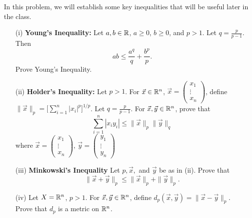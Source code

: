 \documentclass[a4paper]{article}
\begin{document}
\begin{problem}
    In this problem, we will establish some key inequalities that will be useful later in the class. 
    \begin{enumerate}
        \item[(i)] \textbf{Young's Inequality:} Let \( a,b \in \mathbb{R}  \), \( a \geq 0  \), \( b \geq 0  \), and \( p > 1  \). Let \( q = \frac{  p  }{  p - 1  }  \). Then
            \[ ab \leq \frac{ a^{q} }{ q  }  + \frac{ b^{p} }{ p }. \]
           Prove Young's Inequality. 
       \item[(ii)] \textbf{Holder's Inequality:} Let \( p > 1  \). For \( \vec{ x }  \in \mathbb{R}^{n} \), \( \vec{ x  }  = \begin{pmatrix} {x}_{1} \\ \vdots \\ {x}_{n}   \end{pmatrix}  \), define \( \|\vec{ x } \|_p = \displaystyle \Big[ \sum_{ i=1  }^{ n } | {x}_{i} |^{p} \Big]^{1/p} \). Let \( q = \frac{ p  }{  p - 1  } \). For \( \vec{ x } , \vec{ y } \in \mathbb{R}^{n} \), prove that 
           \[  \sum_{ i=1  }^{ n } | {x}_{i} {y}_{i} | \leq \|\vec{ x } \|_{p} \|\vec{ y } \|_{q} \]
           where \( \vec{ x }  = \begin{pmatrix} {x}_{1} \\ \vdots \\ {x}_{n} \end{pmatrix} \), \( \vec{ y  } = \begin{pmatrix} {y}_{1} \\ \vdots \\ {y}_{n} \end{pmatrix} \)
        \item[(iii)] \textbf{Minkowski's Inequality} Let \( p , \vec{ x } ,  \) and \( \vec{ y }  \) be as in (ii). Prove that 
            \[  \|\vec{ x }  + \vec{ y } \|_p \leq \|\vec{ x } \|_{p} + \|\vec{ y } \|_{p}. \]
        \item[(iv)] Let \( X = \mathbb{R}^{n} \), \( p > 1  \). For \( \vec{ x  } , \vec{ y }  \in \mathbb{R}^{n} \), define \( {d}_{p}(\vec{ x } , \vec{ y } ) = \|\vec{ x }  - \vec{ y } \|_{p} \). Prove that \( {d}_{p} \) is a metric on \( \mathbb{R}^{n} \).
    \end{enumerate}
\end{problem}
\end{document}

